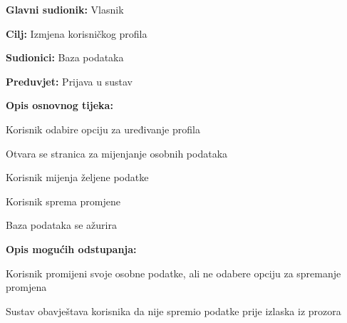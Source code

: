 				\noindent {}
				\begin{packed_item}
					
					\item \textbf{Glavni sudionik: } Vlasnik 
					\item  \textbf{Cilj:} Izmjena korisničkog profila
					\item  \textbf{Sudionici:} Baza podataka
					\item  \textbf{Preduvjet:} Prijava u sustav
					\item  \textbf{Opis osnovnog tijeka:}
					
					\item[] \begin{packed_enum}
						
						\item Korisnik odabire opciju za uređivanje profila
						\item Otvara se stranica za mijenjanje osobnih podataka
						\item Korisnik mijenja željene podatke
						\item Korisnik sprema promjene
						\item Baza podataka se ažurira
					\end{packed_enum}
					
					\item  \textbf{Opis mogućih odstupanja:}
					
					\item[] \begin{packed_item}
						
						\item[3.a] Korisnik promijeni svoje osobne podatke, ali ne odabere opciju za spremanje promjena
						\item[] \begin{packed_enum}
							
							\item Sustav obavještava korisnika da nije spremio podatke prije izlaska iz prozora
							
						\end{packed_enum}
					\end{packed_item}
				\end{packed_item}
				
